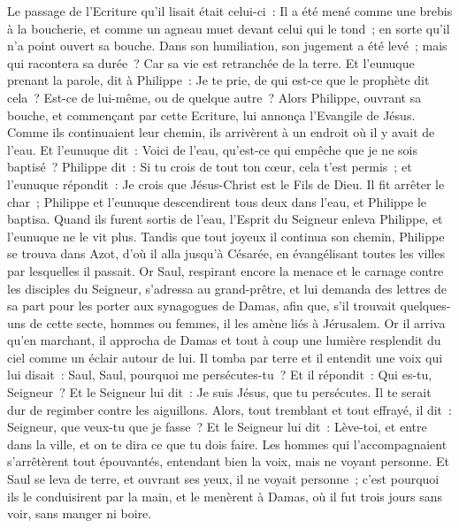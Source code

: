 \begin{multicols}{2}
Le passage de l'Ecriture qu'il lisait était celui-ci~: Il a été mené comme une brebis à la boucherie, et comme un agneau muet devant celui qui le tond~; en sorte qu'il n'a point ouvert sa bouche.
Dans son humiliation, son jugement a été levé~; mais qui racontera sa durée~? Car sa vie est retranchée de la terre.
Et l'eunuque prenant la parole, dit à Philippe~: Je te prie, de qui est-ce que le prophète dit cela~? Est-ce de lui-même, ou de quelque autre~?
Alors Philippe, ouvrant sa bouche, et commençant par cette Ecriture, lui annonça l'Evangile de Jésus.
Comme ils continuaient leur chemin, ils arrivèrent à un endroit où il y avait de l'eau. Et l'eunuque dit~: Voici de l'eau, qu'est-ce qui empêche que je ne sois baptisé~?
Philippe dit~: Si tu crois de tout ton cœur, cela t'est permis~; et l'eunuque répondit~: Je crois que Jésus-Christ est le Fils de Dieu.
Il fit arrêter le char~; Philippe et l'eunuque descendirent tous deux dans l'eau, et Philippe le baptisa.
Quand ils furent sortis de l'eau, l'Esprit du Seigneur enleva Philippe, et l'eunuque ne le vit plus. Tandis que tout joyeux il continua son chemin,
Philippe se trouva dans Azot, d'où il alla jusqu'à Césarée, en évangélisant toutes les villes par lesquelles il passait.
\VerseOne{}Or Saul, respirant encore la menace et le carnage contre les disciples du Seigneur, s'adressa au grand-prêtre,
et lui demanda des lettres de sa part pour les porter aux synagogues de Damas, afin que, s'il trouvait quelques-uns de cette secte, hommes ou femmes, il les amène liés à Jérusalem.
Or il arriva qu'en marchant, il approcha de Damas et tout à coup une lumière resplendit du ciel comme un éclair autour de lui.
Il tomba par terre et il entendit une voix qui lui disait~: Saul, Saul, pourquoi me persécutes-tu~?
Et il répondit~: Qui es-tu, Seigneur~? Et le Seigneur lui dit~: Je suis Jésus, que tu persécutes. Il te serait dur de regimber contre les aiguillons.
Alors, tout tremblant et tout effrayé, il dit~: Seigneur, que veux-tu que je fasse~? Et le Seigneur lui dit~: Lève-toi, et entre dans la ville, et on te dira ce que tu dois faire.
Les hommes qui l'accompagnaient s'arrêtèrent tout épouvantés, entendant bien la voix, mais ne voyant personne.
Et Saul se leva de terre, et ouvrant ses yeux, il ne voyait personne~; c'est pourquoi ils le conduisirent par la main, et le menèrent à Damas,
où il fut trois jours sans voir, sans manger ni boire.

\end{multicols}
